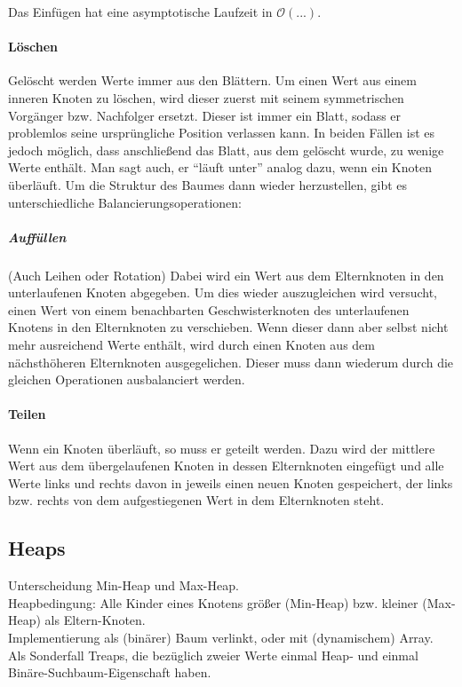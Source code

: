 Das Einfügen hat eine asymptotische Laufzeit in $\mathcal{O}(...)$.

\paragraph{Löschen} Gelöscht werden Werte immer aus den Blättern.
Um einen Wert aus einem inneren Knoten zu löschen,
wird dieser zuerst mit seinem symmetrischen Vorgänger bzw. Nachfolger ersetzt.
Dieser ist immer ein Blatt, sodass er problemlos seine ursprüngliche Position verlassen kann.
In beiden Fällen ist es jedoch möglich, dass anschließend das Blatt, aus dem gelöscht wurde, zu wenige Werte enthält.
Man sagt auch, er "`läuft unter"' analog dazu, wenn ein Knoten überläuft.
Um die Struktur des Baumes dann wieder herzustellen, gibt es unterschiedliche Balancierungsoperationen:

\subparagraph{Auffüllen} (Auch Leihen oder Rotation) Dabei wird ein Wert aus dem Elternknoten in den unterlaufenen Knoten abgegeben.
Um dies wieder auszugleichen wird versucht,
einen Wert von einem benachbarten Geschwisterknoten des unterlaufenen Knotens in den Elternknoten zu verschieben.
Wenn dieser dann aber selbst nicht mehr ausreichend Werte enthält,
wird durch einen Knoten aus dem nächsthöheren Elternknoten ausgegelichen.
Dieser muss dann wiederum durch die gleichen Operationen ausbalanciert werden.

\paragraph{Teilen} Wenn ein Knoten überläuft, so muss er geteilt werden.
Dazu wird der mittlere Wert aus dem übergelaufenen Knoten in dessen Elternknoten eingefügt und alle Werte links und rechts davon in jeweils einen neuen Knoten gespeichert,
der links bzw. rechts von dem aufgestiegenen Wert in dem Elternknoten steht.

\subsection{Heaps}
\label{subsec:Heaps}

Unterscheidung Min-Heap und Max-Heap.\\
Heapbedingung: Alle Kinder eines Knotens größer (Min-Heap) bzw. kleiner (Max-Heap) als Eltern-Knoten.\\
Implementierung als (binärer) Baum verlinkt, oder mit (dynamischem) Array.\\
Als Sonderfall Treaps, die bezüglich zweier Werte einmal Heap- und einmal Binäre-Suchbaum-Eigenschaft haben.

